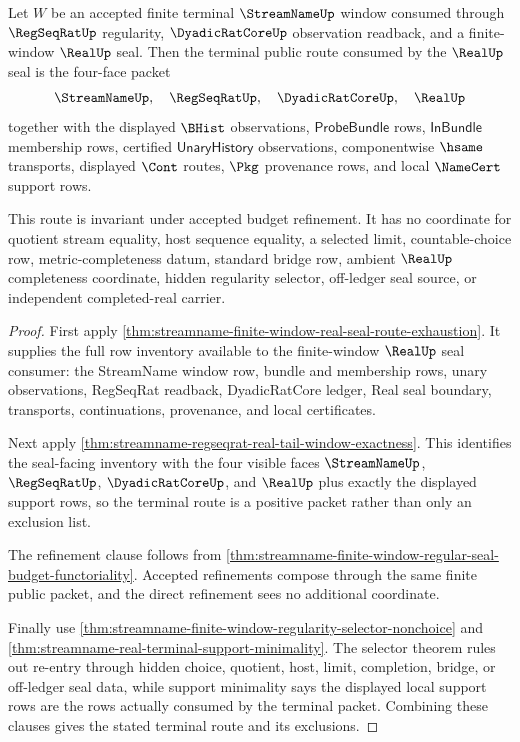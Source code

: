 \begin{theorem}
\label{thm:streamname-finite-window-regular-seal-terminal-route}
Let $W$ be an accepted finite terminal $\StreamNameUp$ window consumed through $\RegSeqRatUp$ regularity, $\DyadicRatCoreUp$ observation readback, and a finite-window $\RealUp$ seal. Then the terminal public route consumed by the $\RealUp$ seal is the four-face packet
$$
\StreamNameUp,\quad \RegSeqRatUp,\quad \DyadicRatCoreUp,\quad \RealUp
$$
together with the displayed $\BHist$ observations, $\mathsf{ProbeBundle}$ rows, $\mathsf{InBundle}$ membership rows, certified $\mathsf{UnaryHistory}$ observations, componentwise $\hsame$ transports, displayed $\Cont$ routes, $\Pkg$ provenance rows, and local $\NameCert$ support rows.

This route is invariant under accepted budget refinement. It has no coordinate for quotient stream equality, host sequence equality, a selected limit, countable-choice row, metric-completeness datum, standard bridge row, ambient $\RealUp$ completeness coordinate, hidden regularity selector, off-ledger seal source, or independent completed-real carrier.
\end{theorem}
\begin{proof}
First apply \autoref{thm:streamname-finite-window-real-seal-route-exhaustion}. It supplies the full row inventory available to the finite-window $\RealUp$ seal consumer: the StreamName window row, bundle and membership rows, unary observations, RegSeqRat readback, DyadicRatCore ledger, Real seal boundary, transports, continuations, provenance, and local certificates.

Next apply \autoref{thm:streamname-regseqrat-real-tail-window-exactness}. This identifies the seal-facing inventory with the four visible faces $\StreamNameUp$, $\RegSeqRatUp$, $\DyadicRatCoreUp$, and $\RealUp$ plus exactly the displayed support rows, so the terminal route is a positive packet rather than only an exclusion list.

The refinement clause follows from \autoref{thm:streamname-finite-window-regular-seal-budget-functoriality}. Accepted refinements compose through the same finite public packet, and the direct refinement sees no additional coordinate.

Finally use \autoref{thm:streamname-finite-window-regularity-selector-nonchoice} and \autoref{thm:streamname-real-terminal-support-minimality}. The selector theorem rules out re-entry through hidden choice, quotient, host, limit, completion, bridge, or off-ledger seal data, while support minimality says the displayed local support rows are the rows actually consumed by the terminal packet. Combining these clauses gives the stated terminal route and its exclusions.
\end{proof}
